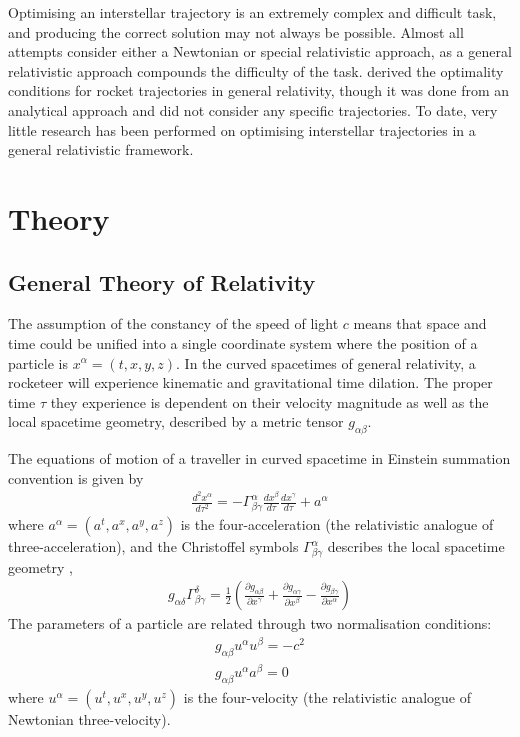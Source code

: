 \documentclass[review]{elsarticle}
\begin{document}
Optimising an interstellar trajectory is an extremely complex and difficult task, and producing the correct solution may not always be possible. Almost all attempts consider either a Newtonian or special relativistic approach, as a general relativistic approach compounds the difficulty of the task. \cite{Henriques2012} derived the optimality conditions for rocket trajectories in general relativity, though it was done from an analytical approach and did not consider any specific trajectories. To date, very little research has been performed on optimising interstellar trajectories in a general relativistic framework.

\section{Theory}
\subsection{General Theory of Relativity}

The assumption of the constancy of the speed of light $c$ means that space and time could be unified into a single coordinate system where the position of a particle is $x^\alpha=(t,x,y,z)$. In the curved spacetimes of general relativity, a rocketeer will experience kinematic and gravitational time dilation. The proper time $\tau$ they experience is dependent on their velocity magnitude as well as the local spacetime geometry, described by a metric tensor $g_{\alpha\beta}$.

The equations of motion of a traveller in curved spacetime in Einstein summation convention is given by
\begin{gather}
\frac{d^2x^\alpha}{d\tau^2}=-\Gamma_{\beta\gamma}^\alpha\frac{dx^\beta}{d\tau}\frac{dx^\gamma}{d\tau} + a^\alpha
\label{geoaccel}
\end{gather}
where $a^\alpha=(a^t,a^x,a^y,a^z)$ is the four-acceleration (the relativistic analogue of three-acceleration), and the Christoffel symbols $\Gamma_{\beta\gamma}^\alpha$ describes the local spacetime geometry \cite{Hartle2003},
\begin{gather}
g_{\alpha\delta}\Gamma_{\beta\gamma}^\delta=\frac{1}{2}\left(\frac{\partial g_{\alpha\beta}}{\partial x^\gamma}+\frac{\partial g_{\alpha\gamma}}{\partial x^\beta}-\frac{\partial g_{\beta\gamma}}{\partial x^\alpha}\right)
\label{christeqn}
\end{gather}
The parameters of a particle are related through two normalisation conditions:
\begin{gather}
g_{\alpha\beta}u^\alpha u^\beta=-c^2\label{norm1}\\
g_{\alpha\beta}u^\alpha a^\beta=0\label{norm2}
\end{gather}
where $u^\alpha=(u^t,u^x,u^y,u^z)$ is the four-velocity (the relativistic analogue of Newtonian three-velocity).
\end{document}
